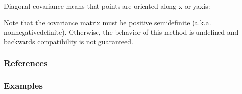 \documentclass[letterpaper,10pt,english]{sphinxmanual}
\begin{document}
\begin{fulllineitems}
\sphinxAtStartPar
Diagonal covariance means that points are oriented along x or y\sphinxhyphen{}axis:

\begin{sphinxVerbatim}[commandchars=\\\{\}]
   
     
  
\end{sphinxVerbatim}

\sphinxAtStartPar
Note that the covariance matrix must be positive semidefinite (a.k.a.
nonnegative\sphinxhyphen{}definite). Otherwise, the behavior of this method is
undefined and backwards compatibility is not guaranteed.
\subsubsection*{References}
\subsubsection*{Examples}

\begin{sphinxVerbatim}[commandchars=\\\{\}]
   
  \PYG{p}{[}\PYG{p}{[} \PYG{p}{]} \PYG{p}{[} \PYG{p}{]}\PYG{p}{]}
     
\end{sphinxVerbatim}


\end{fulllineitems}
\end{document}

